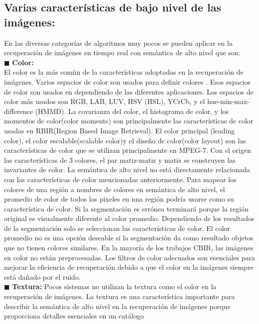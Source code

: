 \documentclass{llncs}
\begin{document}
\subsection { Varias caracter\'isticas de bajo nivel de las im\'agenes:}

En las diversas categor\'ias de algoritmos muy pocos se pueden aplicar en la recuperaci\'on de im\'agenes en tiempo real con 
sem\'antica de alto nivel que son:\\
$\blacksquare$  \textbf{Color:}\\
El color es la m\'as com\'un de la caracter\'isticas adoptadas en la recuperaci\'on de im\'agenes. Varios espacios de color son usados 
para definir colores . Esos espacios de color son usados en dependiendo de las diferentes aplicaciones. Los espacios de color 
m\'as usados son  RGB, LAB, LUV, HSV (HSL), YCrCb, y el hue-min-max-difference (HMMD). La covarianza del color, el histograma 
de color, y los momentos de color(color moments) son principalmente las caracter\'isticas de color usadas en RBIR(Region Based Image Retrieval).
 El color principal (leading color), el color escalable(scalable color)y el dise\~{n}o de color(color layout) son las caracter\'isticas 
de color que se utilizan principalmente en MPEG-7. Con el origen las caracter\'isticas de 3 colores, el par matiz-matiz y matiz
se construyen las invariantes de color. La sem\'antica de alto nivel no est\'a directamente relacionada con las caracter\'isticas 
de color mencionadas anteriormente. Para mapear los colores de una regi\'on a nombres de colores en sem\'antica de alto nivel,
el promedio de color de todos los pixeles  en una regi\'on podr\'ia usarse como su caracter\'istica de color. Si la segmentaci\'on
es err\'onea terminar\'a porque la regi\'on original es visualmente diferente al color promedio. Dependiendo de los resultados 
de la segmentaci\'on solo se seleccionan las caracter\'isticas de color. El color promedio no es una opci\'on deseable si la
segmentaci\'on da como resultado objetos que no tienen colores similares. En la mayor\'ia de los trabajos CBIR, las im\'agenes en color no
est\'an preprocesadas. Los filtros de color adecuados son esenciales para mejorar la eficiencia de recuperaci\'on debido a que el color 
en la im\'agenes siempre est\'a da\~{n}ado por el ruido.\\
$\blacksquare$  \textbf{Textura:}
Pocos sistemas no utilizan la textura como el color en la recuperaci\'on de im\'agenes. La textura es una caracter\'istica importante 
para describir la sem\'antica de alto nivel en la recuperaci\'on de im\'agenes porque proporciona detalles esenciales en un cat\'alogo 
\end{document}
